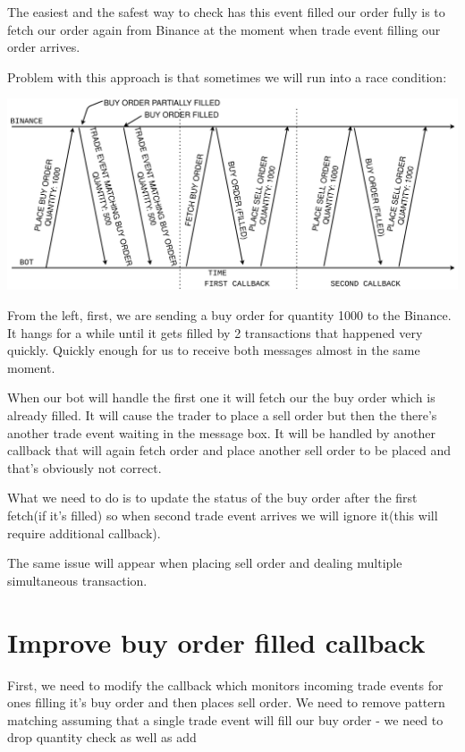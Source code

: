 \documentclass[
  oneside]{book}
\begin{document}
The easiest and the safest way to check has this event filled our order fully is to fetch our order again from Binance at the moment when trade event filling our order arrives.

Problem with this approach is that sometimes we will run into a race condition:

\includegraphics{images/chapter_08_03_race_condition_timeline.png}

From the left, first, we are sending a buy order for quantity 1000 to the Binance. It hangs for a while until it gets filled by 2 transactions that happened very quickly. Quickly enough for us to receive both messages almost in the same moment.

When our bot will handle the first one it will fetch our the buy order which is already filled. It will cause the trader to place a sell order but then the there's another trade event waiting in the message box. It will be handled by another callback that will again fetch order and place another sell order to be placed and that's obviously not correct.

What we need to do is to update the status of the buy order after the first fetch(if it's filled) so when second trade event arrives we will ignore it(this will require additional callback).

The same issue will appear when placing sell order and dealing multiple simultaneous transaction.

\hypertarget{improve-buy-order-filled-callback}{%
\section{Improve buy order filled callback}\label{improve-buy-order-filled-callback}}

First, we need to modify the callback which monitors incoming trade events for ones filling it's buy order and then places sell order. We need to remove pattern matching assuming that a single trade event will fill our buy order - we need to drop quantity check as well as add
\end{document}
